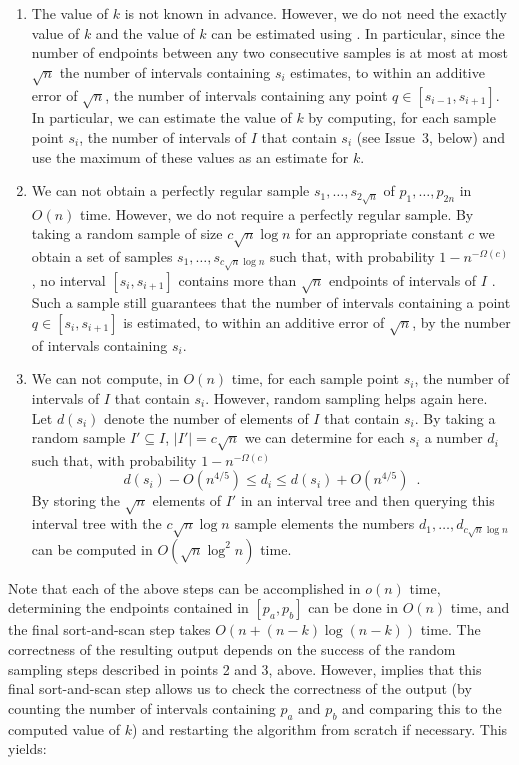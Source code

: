 \documentclass[12pt]{article}
\begin{document}
\begin{enumerate}

\item The value of $k$ is not known in advance.  However, we do not
need the exactly value of $k$ and the value of $k$ can be estimated
using .  In particular, since the number of endpoints
between any two consecutive samples is at most at most $\sqrt{n}$ the
number of intervals containing $s_i$ estimates, to within an additive
error of $\sqrt{n}$, the number of intervals containing any point $q\in
[s_{i-1},s_{i+1}]$. In particular, we can estimate the value of $k$ by
computing, for each sample point $s_i$, the number of intervals of $I$
that contain $s_i$ (see Issue~3, below) and use the maximum of these
values as an estimate for $k$.

\item We can not obtain a perfectly regular sample
$s_1,\ldots,s_{2\sqrt{n}}$ of $p_1,\ldots,p_{2n}$ in $O(n)$ time.
However, we do not require a perfectly regular sample.  By taking a
random sample of size $c\sqrt{n}\log n$ for an appropriate constant
$c$ we obtain a set of samples $s_1,\ldots,s_{c\sqrt{n}\log n}$ such
that, with probability $1-n^{-\Omega(c)}$, no interval
$[s_{i},s_{i+1}]$ contains more than $\sqrt{n}$ endpoints of intervals
of $I$ \cite{m98}.  Such a sample still guarantees that the number of
intervals containing a point $q\in [s_i,s_{i+1}]$ is estimated, to
within an additive error of $\sqrt{n}$, by the number of intervals
containing $s_i$.

\item We can not compute, in $O(n)$ time, for each sample point $s_i$,
the number of intervals of $I$ that contain $s_i$.  However, random
sampling helps again here.  Let $d(s_i)$ denote the number of elements
of $I$ that contain $s_i$. By taking a random sample $I'\subseteq I$,
$|I'|=c\sqrt{n}$ we can determine for each $s_i$ a
number $d_i$ such that, with probability $1-n^{-\Omega(c)}$
\[
        d(s_i) - O(n^{4/5})\le d_i \le
           d(s_i) + O(n^{4/5}) \enspace .
\]
By storing the $\sqrt{n}$ elements of $I'$ in an interval tree \cite{ps85} and
then querying this interval tree with the $c\sqrt{n}\log n$ sample
elements the numbers $d_1,\ldots,d_{c\sqrt{n}\log n}$ can be computed
in $O(\sqrt{n}\log^2 n)$
time.  
\end{enumerate}

Note that each of the above steps can be accomplished in $o(n)$ time,
determining the endpoints contained in $[p_a,p_b]$ can be done in
$O(n)$ time, and the final sort-and-scan step takes $O(n + (n-k)\log
(n-k))$ time.  The correctness of the resulting output depends on the
success of the random sampling steps described in points 2 and 3,
above.  However,  implies that this final sort-and-scan
step allows us to check the correctness of the output (by counting the
number of intervals containing $p_a$ and $p_b$ and comparing this to
the computed value of $k$) and restarting the algorithm from scratch
if necessary.  This yields:
\end{document}
